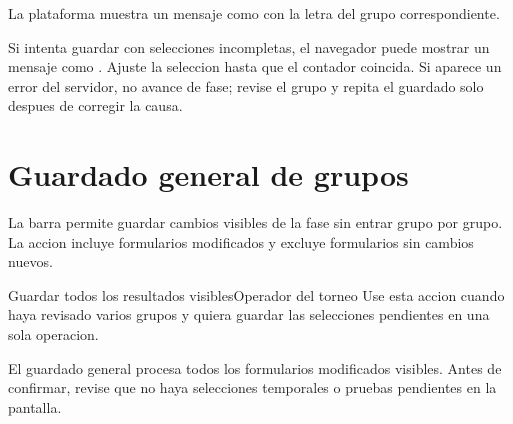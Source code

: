 \begin{resultadoesperado}
La plataforma muestra un mensaje como  con la letra del grupo correspondiente.
\end{resultadoesperado}

\begin{fallas}
Si intenta guardar con selecciones incompletas, el navegador puede mostrar un mensaje como . Ajuste la seleccion hasta que el contador coincida. Si aparece un error del servidor, no avance de fase; revise el grupo y repita el guardado solo despues de corregir la causa.
\end{fallas}

\section{Guardado general de grupos}

La barra  permite guardar cambios visibles de la fase sin entrar grupo por grupo. La accion incluye formularios modificados y excluye formularios sin cambios nuevos.

\begin{procedimiento}{Guardar todos los resultados visibles}{Operador del torneo}
Use esta accion cuando haya revisado varios grupos y quiera guardar las selecciones pendientes en una sola operacion.
\end{procedimiento}


\begin{advertencia}
El guardado general procesa todos los formularios modificados visibles. Antes de confirmar, revise que no haya selecciones temporales o pruebas pendientes en la pantalla.
\end{advertencia}

